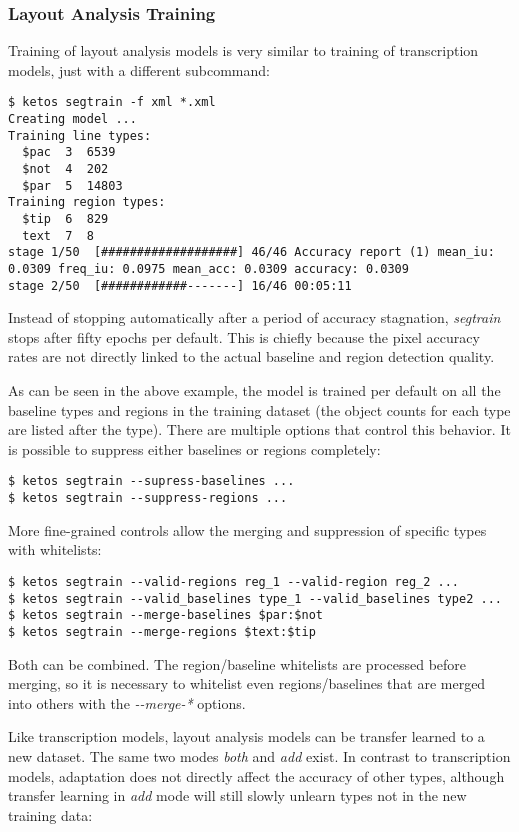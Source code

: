 \subsubsection{Layout Analysis Training}

Training of layout analysis models is very similar to training of transcription
models, just with a different subcommand:

\begin{verbatim}
$ ketos segtrain -f xml *.xml
Creating model ...
Training line types:
  $pac  3  6539
  $not  4  202
  $par  5  14803
Training region types:
  $tip	6  829
  text	7  8
stage 1/50  [###################] 46/46 Accuracy report (1) mean_iu: 0.0309 freq_iu: 0.0975 mean_acc: 0.0309 accuracy: 0.0309
stage 2/50  [############-------] 16/46 00:05:11
\end{verbatim}

Instead of stopping automatically after a period of accuracy stagnation,
\emph{segtrain} stops after fifty epochs per default. This is chiefly because
the pixel accuracy rates are not directly linked to the actual baseline and
region detection quality.

As can be seen in the above example, the model is trained per default on all
the baseline types and regions in the training dataset (the object counts for
each type are listed after the type).  There are multiple options that control
this behavior. It is possible to suppress either baselines or regions
completely:

\begin{verbatim}
$ ketos segtrain --supress-baselines ...
$ ketos segtrain --suppress-regions ...
\end{verbatim}

More fine-grained controls allow the merging and suppression of specific types
with whitelists:

\begin{verbatim}
$ ketos segtrain --valid-regions reg_1 --valid-region reg_2 ...
$ ketos segtrain --valid_baselines type_1 --valid_baselines type2 ...
$ ketos segtrain --merge-baselines $par:$not
$ ketos segtrain --merge-regions $text:$tip
\end{verbatim}

Both can be combined. The region/baseline whitelists are processed before
merging, so it is necessary to whitelist even regions/baselines that are merged
into others with the \emph{-{}-merge-*} options.

Like transcription models, layout analysis models can be transfer learned to a
new dataset. The same two modes \emph{both} and \emph{add} exist. In contrast
to transcription models, adaptation does not directly affect the accuracy of
other types, although transfer learning in \emph{add} mode will still slowly
unlearn types not in the new training data:

